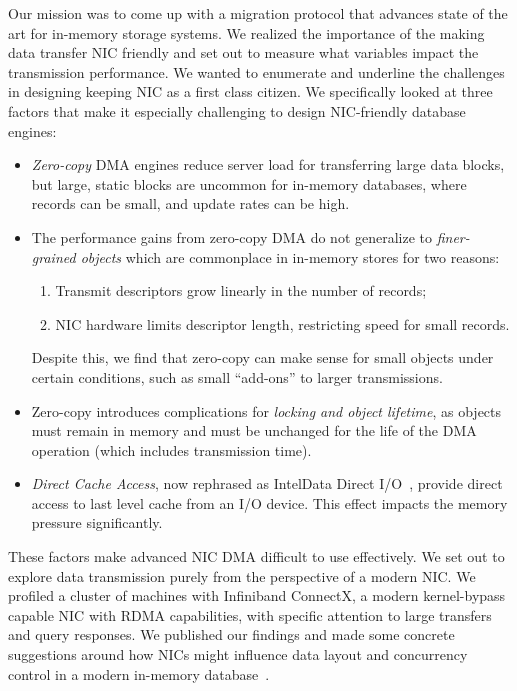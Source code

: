 Our mission was to come up with a migration protocol that advances state of the art for in-memory storage systems.
We realized the importance of the making data transfer NIC friendly and set out to measure what variables impact the 
transmission performance. We wanted to enumerate and underline the challenges in designing keeping NIC as a first class citizen.
We specifically looked at three factors that make it especially challenging to design NIC-friendly
database engines:
\begin{itemize}
  \item {\em Zero-copy} DMA engines reduce server load for transferring large data
    blocks, but large, static blocks are uncommon for in-memory databases,
    where records can be small, and update rates can be high.
  \item The performance gains from zero-copy DMA do not generalize to
      {\em finer-grained objects} which are commonplace in in-memory stores for two reasons:
      \begin{enumerate}
        \item Transmit descriptors grow linearly in the number of records;
        \item NIC hardware limits descriptor length, restricting speed for small records.
      \end{enumerate}
      Despite this, we find that zero-copy can make sense for small objects under certain conditions, such as
      small ``add-ons'' to larger transmissions.
   \item Zero-copy introduces complications for \emph{locking and object
      lifetime}, as objects must remain in memory and must be
      unchanged for the life of the DMA operation (which includes transmission
      time).
  \item {\em Direct Cache Access}, now rephrased as Intel\textregistered Data Direct I/O~\cite{ddio},
      provide direct access to last level cache from an I/O device. This effect
      impacts the memory pressure significantly.

\end{itemize}


These factors make advanced NIC DMA difficult to use effectively. We set out to explore data 
transmission purely from the perspective of a modern NIC. We profiled a cluster of machines with
Infiniband ConnectX, a modern kernel-bypass capable NIC
with RDMA capabilities, with specific attention to large transfers and query responses.
We published our findings and made some concrete suggestions around how NICs might
influence data layout and concurrency control in a modern in-memory 
database~\cite{KesavanRicciStutsman:IMDM16}. 

